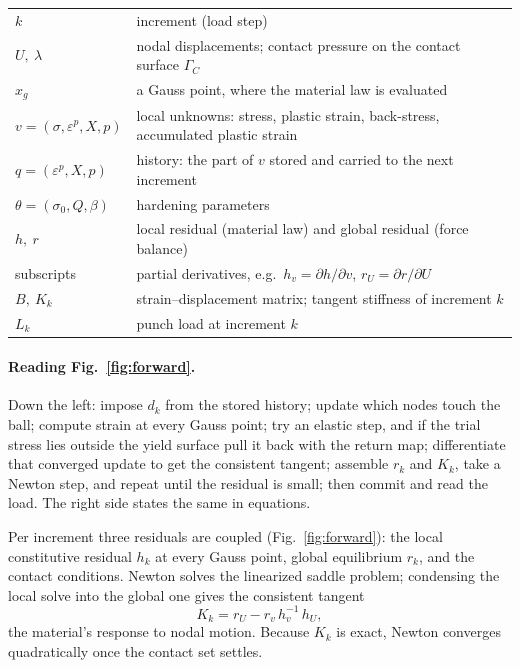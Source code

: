 \documentclass[11pt]{article}
\begin{document}
\begin{center}\small
\begin{tabular}{@{}ll@{}}
\toprule
$k$ & increment (load step)\\
$U,\ \lambda$ & nodal displacements; contact pressure on the contact surface $\Gamma_C$\\
$x_g$ & a Gauss point, where the material law is evaluated\\
$v=(\sigma,\varepsilon^p,X,p)$ & local unknowns: stress, plastic strain, back-stress, accumulated plastic strain\\
$q=(\varepsilon^p,X,p)$ & history: the part of $v$ stored and carried to the next increment\\
$\theta=(\sigma_0,Q,\beta)$ & hardening parameters\\
$h,\ r$ & local residual (material law) and global residual (force balance)\\
subscripts & partial derivatives, e.g.\ $h_v=\partial h/\partial v$, $r_U=\partial r/\partial U$\\
$B,\ K_k$ & strain--displacement matrix; tangent stiffness of increment $k$\\
$L_k$ & punch load at increment $k$\\
\bottomrule
\end{tabular}
\end{center}

\paragraph{Reading Fig.~\ref{fig:forward}.} Down the left: impose $d_k$ from the stored history; update
which nodes touch the ball; compute strain at every Gauss point; try an elastic step, and if the trial stress
lies outside the yield surface pull it back with the return map; differentiate that converged update to get
the consistent tangent; assemble $r_k$ and $K_k$, take a Newton step, and repeat until the residual is small;
then commit and read the load. The right side states the same in equations.

Per increment three residuals are coupled (Fig.~\ref{fig:forward}): the local constitutive residual
$h_k$ at every Gauss point, global equilibrium $r_k$, and the contact conditions. Newton solves the
linearized saddle problem; condensing the local solve into the global one gives the consistent tangent
\begin{equation}
  K_k = r_U - r_v\,h_v^{-1}\,h_U ,
\end{equation}
the material's response to nodal motion. Because $K_k$ is exact, Newton converges quadratically once
the contact set settles.
\end{document}
